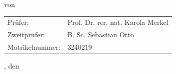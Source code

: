 \begin{titlepage}
\begin{center}
		\textbf{\Large \subjectDocument}

		\vspace*{0.5cm}
		
		{\normalsize von}
		
		\vspace*{0.5cm}
		
		\textbf{\Large \authorDocument}
	
		\vspace*{3.5cm}
		
		\begin{minipage}[t]{13cm}
			\begin{center}
				\begin{tabular}{ll}
					Prüfer: & Prof. Dr. rer. nat. Karola Merkel \\
					Zweitprüfer: & B. Sc. Sebastian Otto \\
					Matrikelnummer: & 3240219 \\
				\end{tabular}
			\end{center}
		\end{minipage}
		
		\vspace*{2.5cm}
	
		{\large \locationDocument, den \dateDocument}
	\end{center}
\end{titlepage}
